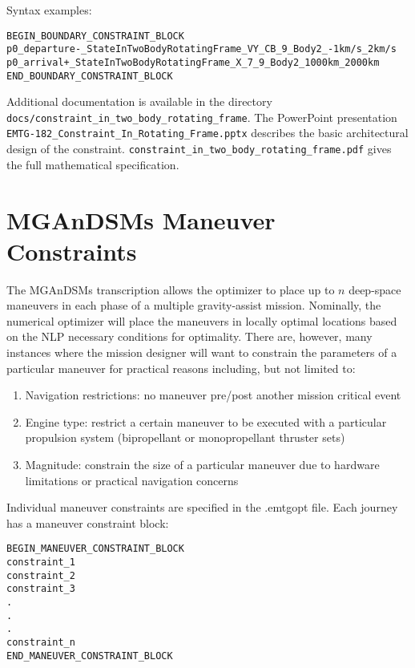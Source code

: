 \documentclass[11pt]{article}
\begin{document}
Syntax examples:

\begin{verbatim}
BEGIN_BOUNDARY_CONSTRAINT_BLOCK
p0_departure-_StateInTwoBodyRotatingFrame_VY_CB_9_Body2_-1km/s_2km/s
p0_arrival+_StateInTwoBodyRotatingFrame_X_7_9_Body2_1000km_2000km
END_BOUNDARY_CONSTRAINT_BLOCK
\end{verbatim}

Additional documentation is available in the directory \texttt{docs/constraint\_in\_two\_body\_rotating\_frame}. The PowerPoint presentation \texttt{EMTG-182\_Constraint\_In\_Rotating\_Frame.pptx} describes the basic architectural design of the constraint. \texttt{constraint\_in\_two\_body\_rotating\_frame.pdf} gives the full mathematical specification.


\section{MGAnDSMs Maneuver Constraints}
\label{sec:MGAnDSMs_Maneuver_Constraints}

The \ac{MGAnDSMs} transcription allows the optimizer to place up to $n$ deep-space maneuvers in each phase of a multiple gravity-assist mission. Nominally, the numerical optimizer will place the maneuvers in locally optimal locations based on the \ac{NLP} necessary conditions for optimality. There are, however, many instances where the mission designer will want to constrain the parameters of a particular maneuver for practical reasons including, but not limited to:

\begin{enumerate}
	\item Navigation restrictions: no maneuver pre/post another mission critical event
	\item Engine type: restrict a certain maneuver to be executed with a particular propulsion system (bipropellant or monopropellant thruster sets)
	\item Magnitude: constrain the size of a particular maneuver due to hardware limitations or practical navigation concerns
\end{enumerate}

Individual maneuver constraints are specified in the .emtgopt file. Each journey has a maneuver constraint block:

\begin{verbatim}
BEGIN_MANEUVER_CONSTRAINT_BLOCK
constraint_1
constraint_2
constraint_3
.
.
.
constraint_n
END_MANEUVER_CONSTRAINT_BLOCK
\end{verbatim}
\end{document}
